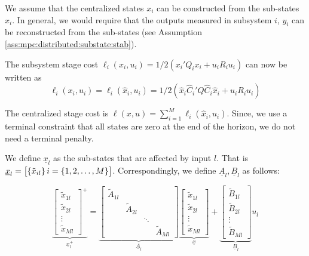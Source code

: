 We assume that the centralized states $x_i$ can be
constructed from the sub-states $\hat{x}_{i}$. In general, we would
require that the outputs measured in subsystem $i$, $y_i$ can be
reconstructed from the sub-states (see Assumption
\ref{ass:mpc:distributed:substate:stab}).

The subsystem stage cost $\ell_i(x_i,u_i) = 1/2(x_i'Q_ix_i + u_iR_iu_i)$
can now be written as 
\[ \ell_i(x_i,u_i) = \ell_i(\hat{x}_i,u_i) = 1/2(\hat{x}_i \hat{C}_i'Q\hat{C}_i \hat{x}_i +
u_iR_iu_i)\]

The centralized stage cost is $\ell(x,u) = \sum_{i=1}^{M}
\ell_i(\hat{x}_i,u_i)$. Since, we use a terminal constraint that all
states are zero at the end of the horizon, we do not need a terminal penalty.
 
We define $\underline{x}_l$ as the sub-states that are affected by
input $l$. That is $\underline{x}_l = \begin{bmatrix}\left\lbrace \tilde{x}_{il} \right\rbrace i =
  \left\lbrace 1,2,\ldots,M \right\rbrace\end{bmatrix}$. Correspondingly, we define
$\underline{A}_l,\underline{B}_l$ as follows:

\begin{equation}
\underbrace{\begin{bmatrix}
\tilde{x}_{1l}\\
\tilde{x}_{2l}\\
\vdots\\
\tilde{x}_{Ml}
\end{bmatrix}^+}_{\underline{x}_l^+} =
\underbrace{\begin{bmatrix}
\tilde{A}_{1l} & & & \\
& \tilde{A}_{2l} & &  \\
& & \ddots & \\
& & & \tilde{A}_{Ml}
\end{bmatrix}
}_{\underline{A}_l}
\underbrace{\begin{bmatrix}
\tilde{x}_{1l}\\
\tilde{x}_{2l}\\
\vdots\\
\tilde{x}_{Ml}
\end{bmatrix}}_{\underline{x}}
+\underbrace{\begin{bmatrix}
\tilde{B}_{1l}\\
\tilde{B}_{2l}\\
\vdots\\
\tilde{B}_{Ml}
\end{bmatrix}
}_{\underline{B}_l}u_l
\label{eq:mpc:distributed:substate:Aunderline}
\end{equation}



